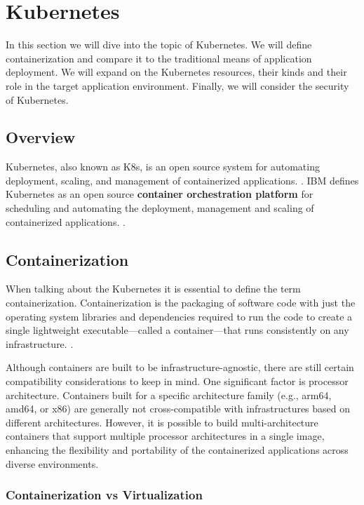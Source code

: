 \section{Kubernetes}

In this section we will dive into the topic of Kubernetes. We will define containerization and compare it to the traditional means of application deployment. We will expand on the Kubernetes resources, their kinds and their role in the target application environment. Finally, we will consider the security of Kubernetes.

\subsection{Overview}

Kubernetes, also known as K8s, is an open source system for automating deployment, scaling, and management of containerized applications. \cite{kubernetes}.
IBM defines Kubernetes as an open source \textbf{container orchestration platform} for scheduling and automating the deployment, management and scaling of containerized applications. \cite{ibm-kubernetes}.

\subsection{Containerization}

When talking about the Kubernetes it is essential to define the term containerization. Containerization is the packaging of software code with just the operating system libraries and dependencies required to run the code to create a single lightweight executable—called a container—that runs consistently on any infrastructure. \cite{ibm-containerization}.

Although containers are built to be infrastructure-agnostic, there are still certain compatibility considerations to keep in mind. One significant factor is processor architecture. Containers built for a specific architecture family (e.g., arm64, amd64, or x86) are generally not cross-compatible with infrastructures based on different architectures. However, it is possible to build multi-architecture containers that support multiple processor architectures in a single image, enhancing the flexibility and portability of the containerized applications across diverse environments.

\subsubsection*{Containerization vs Virtualization}

